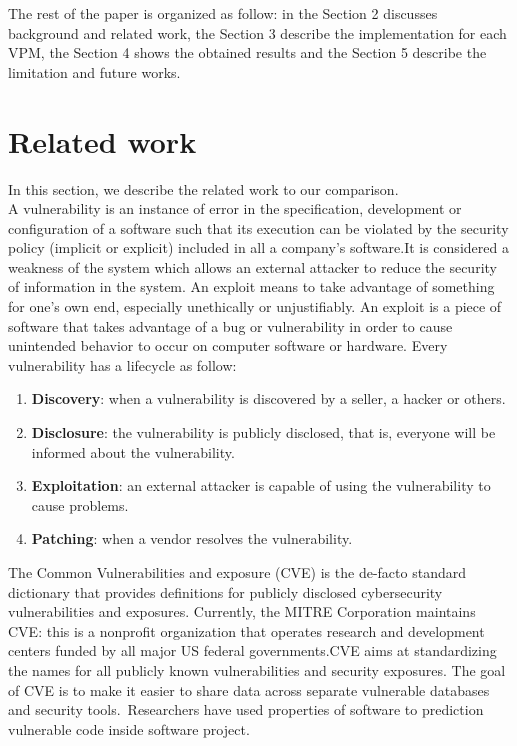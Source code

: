 \documentclass[twocolumn,10pt]{asme2ej}
\begin{document}
The rest of the paper is organized as follow: in the Section 2 discusses background and related work, the Section 3 describe the implementation for each VPM, the Section 4 shows the obtained results and the Section 5 describe the limitation and future works.

\section{Related work}
\label{sec:Section2}
In this section, we describe the related work to our comparison.\\
A vulnerability is an instance of error in the specification, development or configuration of a software such that its execution can be violated by the security policy (implicit or explicit) included in all a company's software.It is considered a weakness of the system which allows an external attacker to reduce the security of information in the system.
An exploit means to take advantage of something for one’s own end, especially unethically or unjustifiably.
An exploit is a piece of software that takes advantage of a bug or vulnerability in order to cause unintended behavior to occur on computer software or hardware. Every vulnerability has a lifecycle as follow:
\begin{enumerate}
    \item \textbf{Discovery}: when a vulnerability is discovered by a seller, a hacker or others.
    \item \textbf{Disclosure}: the vulnerability is publicly disclosed, that is, everyone will be informed about the vulnerability.
    \item \textbf{Exploitation}: an external attacker is capable of using the vulnerability to cause problems.
    \item \textbf{Patching}: when a vendor resolves the vulnerability.
\end{enumerate}
The Common Vulnerabilities and exposure (CVE) is the de-facto standard dictionary that provides definitions for publicly disclosed cybersecurity vulnerabilities and exposures. Currently, the MITRE Corporation maintains CVE: this is a nonprofit organization that operates research and development centers funded by all major US federal governments.CVE aims at standardizing the names for all publicly known vulnerabilities and security exposures. The goal of CVE is to make it easier to share data across separate vulnerable databases and security tools.\
Researchers have used properties of software to prediction vulnerable code inside software project.
\end{document}

